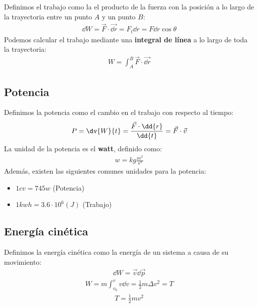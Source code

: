 \documentclass{article}
\begin{document}
Definimos el trabajo como la el producto de la fuerza con la posición a lo largo de la trayectoria
entre un punto $A$ y un punto $B$:
\begin{equation}
    \begin{split}
        \dd{W} = \vec{F}\cdot \vec{ \dd{r}} = F_{t} \dd{r} = F \dd{r} \cos \theta 
    \end{split}
\end{equation}
Podemos calcular el trabajo mediante una \textbf{integral de línea} a lo largo de toda la
trayectoria:
\begin{equation}\tag*{$[W]=J$}
    \begin{split}
        W = \int_{A}^B \vec{F}\cdot  \vec{\dd{r}}
    \end{split}
\end{equation}
\subsection{Potencia}
Definimos la potencia como el cambio en el trabajo con respecto al tiempo:
\begin{equation}
    \begin{split}
        P= \dv{W}{t} = \frac{\vec{F}\cdot \dd{r}}{ \dd{t}}= \vec{F}\cdot \vec{v}
    \end{split}
\end{equation}
La unidad de la potencia es el \textbf{watt}, definido como:
\begin{equation}
    \begin{split}
        w = kg \frac{m^{2}}{s^{3}}
    \end{split}
\end{equation}
Además, existen las siguientes comunes unidades para la potencia:
\begin{itemize}
    \item $1cv = 745w$ (Potencia)
    \item $1kwh = 3.6 \cdot 10^{6}(J)$ (Trabajo)
\end{itemize}
\subsection{Energía cinética}
Definimos la energía cinética como la energía de un sistema a causa de su movimiento:
\begin{equation}
    \begin{split}
        \dd{W} = \vec{v} \dd{\vec{p}}
    \end{split}
\end{equation}
\begin{equation}
    \begin{split}
        W = m \int_{v_{0}}^v v \dd{v} = \frac{1}{2} m \Delta v^{2} = T
    \end{split}
\end{equation}
\begin{equation}
    \begin{split}
        T = \frac{1}{2} m v^{2}
    \end{split}
\end{equation}
\end{document}
